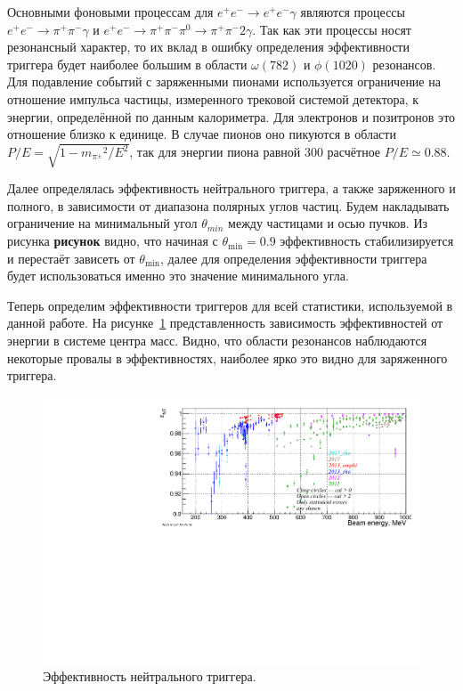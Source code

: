 Основными фоновыми процессам для $e^+ e^- \to e^+ e^-\gamma$ являются процессы
$e^+ e^- \to \pi^+ \pi^- \gamma$ и $e^+ e^- \to \pi^+ \pi^- \pi^0 \to \pi^+ \pi^- 2\gamma$.
Так как эти процессы носят резонансный характер,
то их вклад в ошибку определения эффективности триггера будет наиболее большим в области $\omega (782)$ и $\phi (1020)$ резонансов.
Для подавление событий с заряженными пионами используется ограничение на отношение импульса частицы,
измеренного трековой системой детектора, к энергии, определённой по данным калориметра.
Для электронов и позитронов это отношение близко к единице.
В случае пионов оно пикуются в области $P/E = \sqrt{1 - {m_{\pi^\pm}}^2 / E^2}$,
так для энергии пиона равной \SI{300}{\MeVr} расчётное $P/E \simeq 0.88$.

Далее определялась эффективность нейтрального триггера,
а также заряженного и полного, в зависимости от диапазона полярных углов частиц.
Будем накладывать ограничение на минимальный угол $\theta_{min}$ между частицами и осью пучков.
Из рисунка \textbf{рисунок} видно,
что начиная с $\theta_{\min} = 0.9$ эффективность стабилизируется и перестаёт зависеть от $\theta_{\min}$,
далее для определения эффективности триггера будет использоваться именно это значение минимального угла.

Теперь определим эффективности триггеров для всей статистики, используемой в данной работе.
На рисунке~\ref{fig:nt_eff} представленность зависимость эффективностей от энергии в системе центра масс.
Видно, что области резонансов наблюдаются некоторые провалы в эффективностях,
наиболее ярко это видно для заряженного триггера.


\begin{figure}
    \centering
    \includegraphics[width=\textwidth]{img/nt_eff.pdf}
    \caption{Эффективность нейтрального триггера.}
    \label{fig:nt_eff}
\end{figure}



